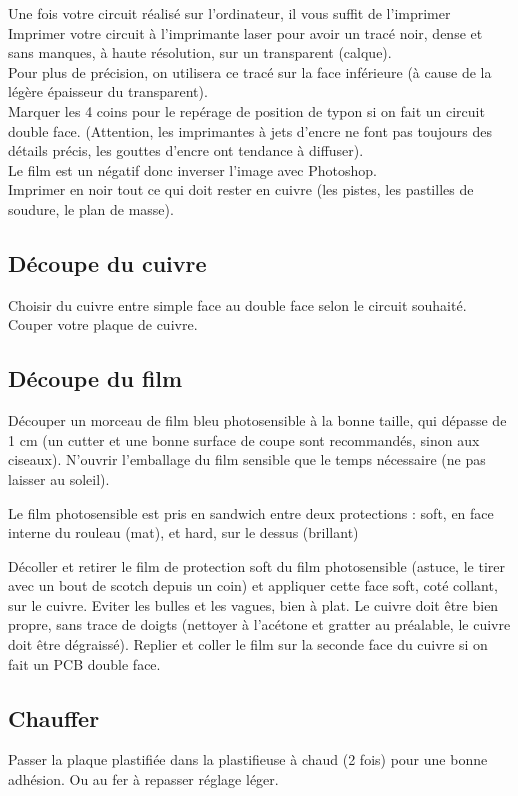 Une fois votre circuit réalisé sur l'ordinateur, il vous suffit de l'imprimer
Imprimer votre circuit à l'imprimante laser pour avoir un tracé noir, dense et sans manques, à haute résolution, sur un transparent (calque).\\
Pour plus de précision, on utilisera ce tracé sur la face inférieure (à cause de la légère épaisseur du transparent).\\

Marquer les 4 coins pour le repérage de position de typon si on fait un circuit double face. (Attention, les imprimantes à jets d'encre ne font pas toujours des détails précis, les gouttes d'encre ont tendance à diffuser).\\

Le film est un négatif donc inverser l'image avec Photoshop.\\

Imprimer en noir tout ce qui doit rester en cuivre (les pistes, les pastilles de soudure, le plan de masse).

\subsection{Découpe du cuivre}
Choisir du cuivre entre simple face au double face selon le circuit souhaité.
Couper votre plaque de cuivre.

\subsection{Découpe du film}
Découper un morceau de film bleu photosensible à la bonne taille, qui dépasse de 1 cm (un cutter et une bonne surface de coupe sont recommandés, sinon aux ciseaux). N'ouvrir l'emballage du film sensible que le temps nécessaire (ne pas laisser au soleil).

Le film photosensible est pris en sandwich entre deux protections : soft, en face interne du rouleau (mat), et hard, sur le dessus (brillant)

Décoller et retirer le film de protection soft du film photosensible (astuce, le tirer avec un bout de scotch depuis un coin) et appliquer cette face soft, coté collant, sur le cuivre. Eviter les bulles et les vagues, bien à plat. Le cuivre doit être bien propre, sans trace de doigts (nettoyer à l'acétone et gratter au préalable, le cuivre doit être dégraissé).
Replier et coller le film sur la seconde face du cuivre si on fait un PCB double face.

\subsection{Chauffer}
Passer la plaque plastifiée dans la plastifieuse à chaud (2 fois) pour une bonne adhésion. Ou au fer à repasser réglage léger.

